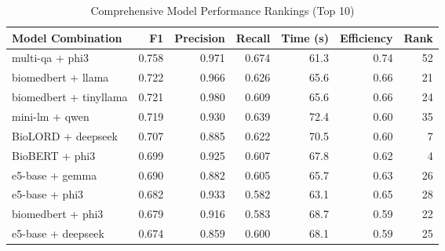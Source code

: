 \begin{table}
\caption{Comprehensive Model Performance Rankings (Top 10)}
\label{tab:comprehensive_rankings}
\begin{tabular}{lrrrrrr}
\toprule
Model Combination & F1 & Precision & Recall & Time (s) & Efficiency & Rank \\
\midrule
multi-qa + phi3 & 0.758 & 0.971 & 0.674 & 61.3 & 0.74 & 52 \\
biomedbert + llama & 0.722 & 0.966 & 0.626 & 65.6 & 0.66 & 21 \\
biomedbert + tinyllama & 0.721 & 0.980 & 0.609 & 65.6 & 0.66 & 24 \\
mini-lm + qwen & 0.719 & 0.930 & 0.639 & 72.4 & 0.60 & 35 \\
BioLORD + deepseek & 0.707 & 0.885 & 0.622 & 70.5 & 0.60 & 7 \\
BioBERT + phi3 & 0.699 & 0.925 & 0.607 & 67.8 & 0.62 & 4 \\
e5-base + gemma & 0.690 & 0.882 & 0.605 & 65.7 & 0.63 & 26 \\
e5-base + phi3 & 0.682 & 0.933 & 0.582 & 63.1 & 0.65 & 28 \\
biomedbert + phi3 & 0.679 & 0.916 & 0.583 & 68.7 & 0.59 & 22 \\
e5-base + deepseek & 0.674 & 0.859 & 0.600 & 68.1 & 0.59 & 25 \\
\bottomrule
\end{tabular}
\end{table}